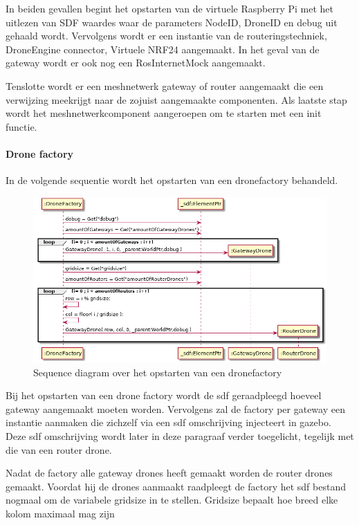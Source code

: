 \documentclass[a4paper, 11pt, oneside]{report}
\begin{document}
In beiden gevallen begint het opstarten van de virtuele Raspberry Pi met het uitlezen van SDF waardes waar de parameters NodeID, DroneID en debug uit gehaald wordt.
Vervolgens wordt er een instantie van de routeringstechniek, DroneEngine connector, Virtuele NRF24 aangemaakt.
In het geval van de gateway wordt er ook nog een RosInternetMock aangemaakt.

Tenslotte wordt er een meshnetwerk gateway of router aangemaakt die een verwijzing meekrijgt naar de zojuist aangemaakte componenten.
Als laatste stap wordt het meshnetwerkcomponent aangeroepen om te starten met een init functie.

\paragraph{Drone factory}
\label{DetailedDesign:MeshNetwerk:sequence:dronefactory}
In de volgende sequentie wordt het opstarten van een dronefactory behandeld.   

\begin{figure}[H]
	\begin{center}\includegraphics[width=.90\linewidth]{UML/out/DroneSimulation/Sequence/DroneFactory/DroneFactory.png}\end{center}
	\caption{Sequence diagram over het opstarten van een dronefactory}
	\label{fig:communication:MeshNetwerk:sequence:dronefactory}
\end{figure}

Bij het opstarten van een drone factory wordt de sdf geraadpleegd hoeveel gateway aangemaakt moeten worden. 
Vervolgens zal de factory per gateway een instantie aanmaken die zichzelf via een sdf omschrijving injecteert in gazebo.
Deze sdf omschrijving wordt later in deze paragraaf verder toegelicht, tegelijk met die van een router drone.

Nadat de factory alle gateway drones heeft gemaakt worden de router drones gemaakt.
Voordat hij de drones aanmaakt raadpleegt de factory het sdf bestand nogmaal om de variabele gridsize in te stellen.
Gridsize bepaalt hoe breed elke kolom maximaal mag zijn
\end{document}
